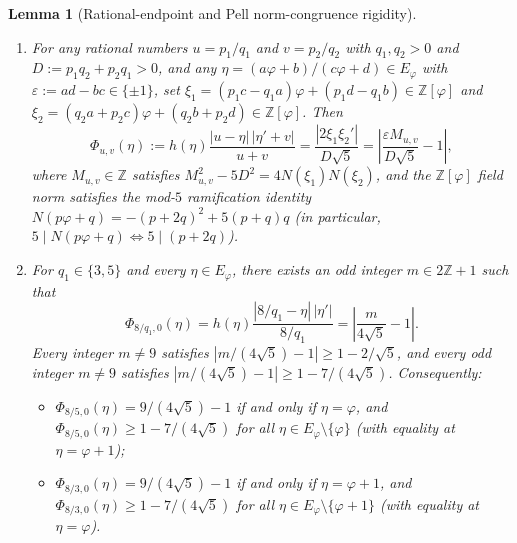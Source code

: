 \documentclass[11pt]{amsart}
\newtheorem{lemma}[theorem]{Lemma}
\theoremstyle{definition}
\theoremstyle{remark}
\numberwithin{equation}{section}
\newcommand{\Z}{\mathbb{Z}}
\begin{document}
\begin{lemma}[Rational-endpoint and Pell norm-congruence rigidity]\label{lem:pell-b2-rigidity}
\begin{enumerate}
\item For any rational numbers $u=p_1/q_1$ and $v=p_2/q_2$ with
      $q_1,q_2>0$ and $D:=p_1q_2+p_2q_1>0$, and any
      $\eta=(a\varphi+b)/\allowbreak(c\varphi+d)\in E_\varphi$ with
      $\varepsilon:=ad-bc\in\{\pm1\}$, set
      $\xi_1=(p_1c-q_1a)\varphi+(p_1d-q_1b)\in\Z[\varphi]$ and
      $\xi_2=(q_2a+p_2c)\varphi+(q_2b+p_2d)\in\Z[\varphi]$. Then
      \[
       \Phi_{u,v}(\eta):=h(\eta)\frac{|u-\eta|\,|\eta'+v|}{u+v}
       =\frac{|2\xi_1\xi_2'|}{D\sqrt5}
       =\left|\frac{\varepsilon M_{u,v}}{D\sqrt5}-1\right|,
      \]
      where $M_{u,v}\in\Z$ satisfies
      $M_{u,v}^2-5D^2=4N(\xi_1)N(\xi_2)$, and the $\Z[\varphi]$ field norm
      satisfies the mod-$5$ ramification identity
      $N(p\varphi+q)=-(p+2q)^2+5(p+q)q$ (in particular,
      $5\mid N(p\varphi+q)\iff 5\mid(p+2q)$).
\item For $q_1\in\{3,5\}$ and every $\eta\in E_\varphi$, there exists an
      \emph{odd} integer $m\in 2\Z+1$ such that
      \[
       \Phi_{8/q_1,0}(\eta)=h(\eta)\frac{|8/q_1-\eta|\,|\eta'|}{8/q_1}
       =\left|\frac{m}{4\sqrt5}-1\right|.
      \]
      Every integer $m\ne9$ satisfies
      $|m/(4\sqrt5)-1|\ge 1-2/\sqrt5$, and every \emph{odd} integer
      $m\ne9$ satisfies $|m/(4\sqrt5)-1|\ge 1-7/(4\sqrt5)$.
      Consequently:
      \begin{itemize}
      \item $\Phi_{8/5,0}(\eta)=9/(4\sqrt5)-1$ if and only if
            $\eta=\varphi$, and $\Phi_{8/5,0}(\eta)\ge 1-7/(4\sqrt5)$
            for all $\eta\in E_\varphi\setminus\{\varphi\}$ (with
            equality at $\eta=\varphi+1$);
      \item $\Phi_{8/3,0}(\eta)=9/(4\sqrt5)-1$ if and only if
            $\eta=\varphi+1$, and $\Phi_{8/3,0}(\eta)\ge 1-7/(4\sqrt5)$
            for all $\eta\in E_\varphi\setminus\{\varphi+1\}$ (with
            equality at $\eta=\varphi$).
      \end{itemize}
\end{enumerate}
\end{lemma}
\end{document}
